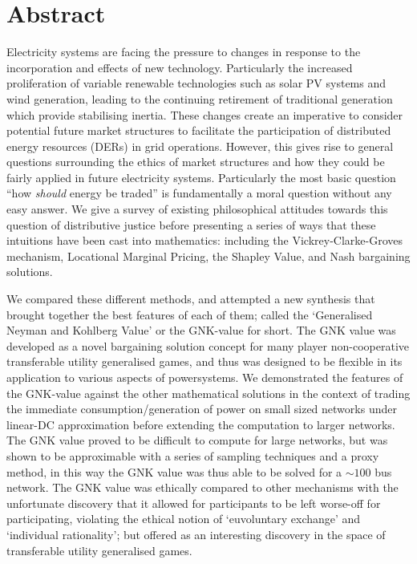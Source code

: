 \chapter*{Abstract}
\vspace{-1em}


Electricity systems are facing the pressure to changes in response to the incorporation and effects of new technology.
Particularly the increased proliferation of variable renewable technologies such as solar PV systems and wind generation, leading to the continuing retirement of traditional generation which provide stabilising inertia.
These changes create an imperative to consider potential future market structures to facilitate the participation of distributed energy resources (DERs) in grid operations.
However, this gives rise to general questions surrounding the ethics of market structures and how they could be fairly applied in future electricity systems. Particularly the most basic question ``how \textit{should} energy be traded'' is fundamentally a moral question without any easy answer.
We give a survey of existing philosophical attitudes towards this question of distributive justice before presenting a series of ways that these intuitions have been cast into mathematics: including the Vickrey-Clarke-Groves mechanism, Locational Marginal Pricing, the Shapley Value, and Nash bargaining solutions.

We compared these different methods, and attempted a new synthesis that brought together the best features of each of them; called the `Generalised Neyman and Kohlberg Value' or the GNK-value for short.
The GNK value was developed as a novel bargaining solution concept for many player non-cooperative transferable utility generalised games, and thus was designed to be flexible in its application to various aspects of powersystems.
We demonstrated the features of the GNK-value against the other mathematical solutions in the context of trading the immediate consumption/generation of power on small sized networks under linear-DC approximation before extending the computation to larger networks.
The GNK value proved to be difficult to compute for large networks, but was shown to be approximable with a series of sampling techniques and a proxy method, in this way the GNK value was thus able to be solved for a $\sim 100$ bus network.
The GNK value was ethically compared to other mechanisms with the unfortunate discovery that it allowed for participants to be left worse-off for participating, violating the ethical notion of `euvoluntary exchange' and `individual rationality'; but offered as an interesting discovery in the space of transferable utility generalised games.

